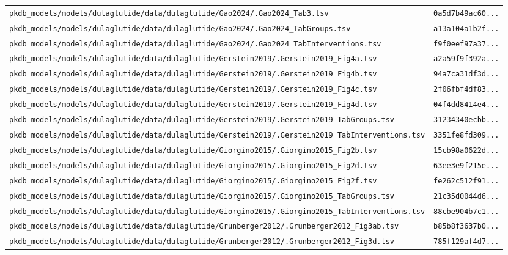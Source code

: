 \begin{longtable}{ll}
\texttt{pkdb\_models/models/dulaglutide/data/dulaglutide/Gao2024/.Gao2024\_Tab3.tsv} & \texttt{0a5d7b49ac60...} \\
\texttt{pkdb\_models/models/dulaglutide/data/dulaglutide/Gao2024/.Gao2024\_TabGroups.tsv} & \texttt{a13a104a1b2f...} \\
\texttt{pkdb\_models/models/dulaglutide/data/dulaglutide/Gao2024/.Gao2024\_TabInterventions.tsv} & \texttt{f9f0eef97a37...} \\
\texttt{pkdb\_models/models/dulaglutide/data/dulaglutide/Gerstein2019/.Gerstein2019\_Fig4a.tsv} & \texttt{a2a59f9f392a...} \\
\texttt{pkdb\_models/models/dulaglutide/data/dulaglutide/Gerstein2019/.Gerstein2019\_Fig4b.tsv} & \texttt{94a7ca31df3d...} \\
\texttt{pkdb\_models/models/dulaglutide/data/dulaglutide/Gerstein2019/.Gerstein2019\_Fig4c.tsv} & \texttt{2f06fbf4df83...} \\
\texttt{pkdb\_models/models/dulaglutide/data/dulaglutide/Gerstein2019/.Gerstein2019\_Fig4d.tsv} & \texttt{04f4dd8414e4...} \\
\texttt{pkdb\_models/models/dulaglutide/data/dulaglutide/Gerstein2019/.Gerstein2019\_TabGroups.tsv} & \texttt{31234340ecbb...} \\
\texttt{pkdb\_models/models/dulaglutide/data/dulaglutide/Gerstein2019/.Gerstein2019\_TabInterventions.tsv} & \texttt{3351fe8fd309...} \\
\texttt{pkdb\_models/models/dulaglutide/data/dulaglutide/Giorgino2015/.Giorgino2015\_Fig2b.tsv} & \texttt{15cb98a0622d...} \\
\texttt{pkdb\_models/models/dulaglutide/data/dulaglutide/Giorgino2015/.Giorgino2015\_Fig2d.tsv} & \texttt{63ee3e9f215e...} \\
\texttt{pkdb\_models/models/dulaglutide/data/dulaglutide/Giorgino2015/.Giorgino2015\_Fig2f.tsv} & \texttt{fe262c512f91...} \\
\texttt{pkdb\_models/models/dulaglutide/data/dulaglutide/Giorgino2015/.Giorgino2015\_TabGroups.tsv} & \texttt{21c35d0044d6...} \\
\texttt{pkdb\_models/models/dulaglutide/data/dulaglutide/Giorgino2015/.Giorgino2015\_TabInterventions.tsv} & \texttt{88cbe904b7c1...} \\
\texttt{pkdb\_models/models/dulaglutide/data/dulaglutide/Grunberger2012/.Grunberger2012\_Fig3ab.tsv} & \texttt{b85b8f3637b0...} \\
\texttt{pkdb\_models/models/dulaglutide/data/dulaglutide/Grunberger2012/.Grunberger2012\_Fig3d.tsv} & \texttt{785f129af4d7...} \\

\end{longtable}
